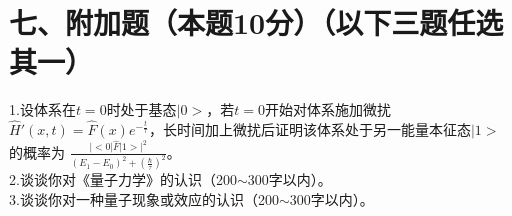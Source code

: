 \documentclass[UTF8]{ctexart}
\begin{document}
\section*{七、附加题（本题10分）（以下三题任选其一）}
1.设体系在$t=0$时处于基态$\lvert 0>$，若$t=0$开始对体系施加微扰$\hat H'(x,t)=
  \hat F(x)e^{-\frac{t}{\tau}}$，长时间加上微扰后证明该体系处于另一能量本征态$\lvert 1>$的概率为
$\frac{\lvert<0\lvert\hat F\rvert 1>\rvert^2}{(E_1-E_0)^2+(\frac{\hbar}{\tau})^2}$。\\
2.谈谈你对《量子力学》的认识（200$\sim$300字以内）。\\
3.谈谈你对一种量子现象或效应的认识（200$\sim$300字以内）。
\end{document}
